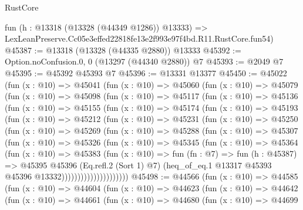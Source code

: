 \begin{lexlean}{RustCore}
\begin{coremodule}
    fun (h : @13318 (@13328 (@44349 @1286)) @13333) =>
    LexLeanPreserve.Cc05e3effed22818fe13e2f993e97f4bd.R11.RustCore.fun54)
@45387 := @13318 (@13328 (@44335 @2880)) @13333
@45392 := Option.noConfusion.{0, 0} (@13297 (@44340 @2880)) @7
@45393 := @2049 @7
@45395 := @45392 @45393 @7
@45396 := @13331 @13377
@45450 := @45022
    (fun (x : @10) =>
    @45041
      (fun (x : @10) =>
      @45060
        (fun (x : @10) =>
        @45079
          (fun (x : @10) =>
          @45098
            (fun (x : @10) =>
            @45117
              (fun (x : @10) =>
              @45136
                (fun (x : @10) =>
                @45155
                  (fun (x : @10) =>
                  @45174
                    (fun (x : @10) =>
                    @45193
                      (fun (x : @10) =>
                      @45212
                        (fun (x : @10) =>
                        @45231
                          (fun (x : @10) =>
                          @45250
                            (fun (x : @10) =>
                            @45269
                              (fun (x : @10) =>
                              @45288
                                (fun (x : @10) =>
                                @45307
                                  (fun (x : @10) =>
                                  @45326
                                    (fun (x : @10) =>
                                    @45345
                                      (fun (x : @10) =>
                                      @45364
                                        (fun (x : @10) =>
                                        @45383
                                          (fun (x : @10) =>
                                          fun (fn : @7) =>
                                          fun (h : @45387) =>
                                          @45395
                                            @45396
                                            (Eq.refl.{2} (Sort 1) @7)
                                            (heq_of_eq.{1}
                                              @13317
                                              @45393
                                              @45396
                                              @13332)))))))))))))))))))))
@45498 := @44566
    (fun (x : @10) =>
    @44585
      (fun (x : @10) =>
      @44604
        (fun (x : @10) =>
        @44623
          (fun (x : @10) =>
          @44642
            (fun (x : @10) =>
            @44661
              (fun (x : @10) =>
              @44680
                (fun (x : @10) =>
                @44699

\end{coremodule}
\end{lexlean}
